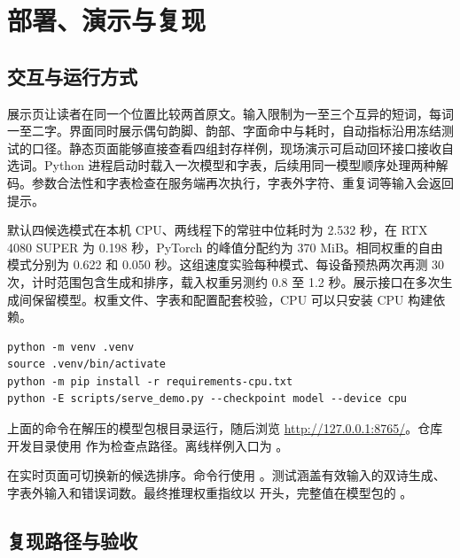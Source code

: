 \section{部署、演示与复现}
\label{sec:deployment}

\subsection{交互与运行方式}

展示页让读者在同一个位置比较两首原文。输入限制为一至三个互异的短词，每词一至二字。界面同时展示偶句韵脚、韵部、字面命中与耗时，自动指标沿用冻结测试的口径。静态页面能够直接查看四组封存样例，现场演示可启动回环接口接收自选词。Python 进程启动时载入一次模型和字表，后续用同一模型顺序处理两种解码。参数合法性和字表检查在服务端再次执行，字表外字符、重复词等输入会返回提示。


默认四候选模式在本机 CPU、两线程下的常驻中位耗时为 2.532 秒，在 RTX 4080 SUPER 为 0.198 秒，PyTorch 的峰值分配约为 370 MiB。相同权重的自由模式分别为 0.622 和 0.050 秒。这组速度实验每种模式、每设备预热两次再测 30 次，计时范围包含生成和排序，载入权重另测约 0.8 至 1.2 秒。展示接口在多次生成间保留模型。权重文件、字表和配置配套校验，CPU 可以只安装 CPU 构建依赖。


\begin{tcolorbox}[consolestyle]
\begin{Verbatim}[fontsize=\small,breaklines=true]
python -m venv .venv
source .venv/bin/activate
python -m pip install -r requirements-cpu.txt
python -E scripts/serve_demo.py --checkpoint model --device cpu
\end{Verbatim}
\end{tcolorbox}

上面的命令在解压的模型包根目录运行，随后浏览 \url{http://127.0.0.1:8765/}。仓库开发目录使用  作为检查点路径。离线样例入口为 。

在实时页面可切换新的候选排序。命令行使用 。测试涵盖有效输入的双诗生成、字表外输入和错误词数。最终推理权重指纹以  开头，完整值在模型包的 。

\subsection{复现路径与验收}

